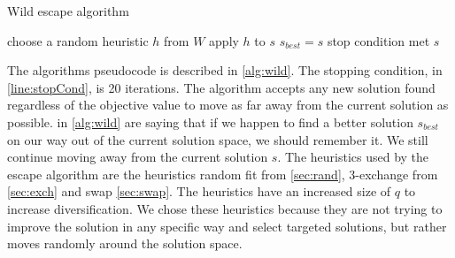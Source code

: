 \documentclass[../main.tex]{subfiles}
\begin{document}
\begin{algorithm}
    \label{alg:wild}
    \caption{Wild escape algorithm}
    \begin{algorithmic}[1]
        \Repeat
            \State choose a random heuristic $h$ from $W$
            \State apply $h$ to $s$
             \label{line:best}
                \State $s_{best} = s$ \label{line:best2}
            \EndIf
        \Until stop condition met \label{line:stopCond}
        \State \Return $s$
        \EndFunction
    \end{algorithmic}
\end{algorithm}

The algorithms pseudocode is described in \cref{alg:wild}. 
The stopping condition, in \cref{line:stopCond}, is 20 iterations. 
The algorithm accepts any new solution found regardless of the objective value to move as far away from the current solution as possible.
 in \cref{alg:wild} are saying that if we happen to find a better solution $s_{best}$ on our way out of the current solution space, we should remember it. We still continue moving away from the current solution $s$.
The heuristics used by the escape algorithm are the heuristics random fit from \cref{sec:rand}, 3-exchange from \cref{sec:exch} and swap \cref{sec:swap}. 
The heuristics have an increased size of $q$ to increase diversification. 
We chose these heuristics because they are not trying to improve the solution in any specific way and select targeted solutions, but rather moves randomly around the solution space. 
\biblio                                                         
\end{document}
